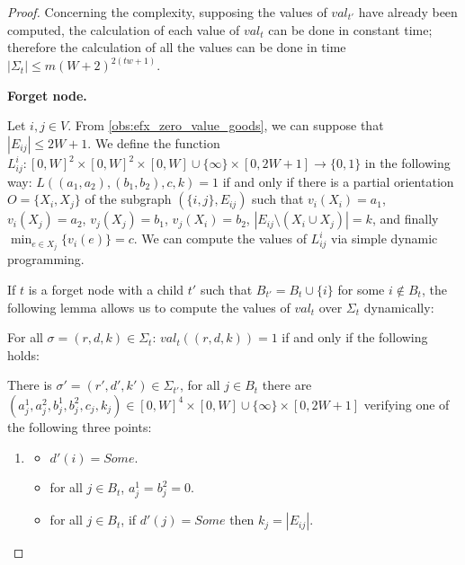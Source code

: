 \documentclass[11pt,letterpaper]{article}
\begin{document}
\begin{proof}
    Concerning the complexity, supposing the values of $val_{t'}$ have already been computed, the calculation of each value of $val_t$ can be done in constant time; therefore the calculation of all the values can be done in time $|\Sigma_t|\leq m(W+2)^{2(tw+1)}$.

    \textbf{Forget node.}

    Let $i,j\in V$. From \cref{obs:efx_zero_value_goods}, we can suppose that $|E_{ij}|\leq 2W +1$. We define the function $L_{ij}^i\colon [0,W]^2\times [0,W]^2\times[0,W]\cup\{\infty\}\times[0,2W+1]\to \{0,1\} $ in the following way:
    $L((a_1,a_2),(b_1,b_2),c,k)=1$ if and only if there is a partial orientation  $O=\{X_i,X_j\}$ of the subgraph $(\{i,j\},E_{ij})$ such that $v_i(X_i)=a_1$, $v_i(X_j)=a_2$, $v_j(X_j)=b_1$, $v_j(X_i)=b_2$, $|E_{ij}\setminus (X_i\cup X_j)|=k$, and finally $\min_{e\in X_j}\{v_i(e)\}=c$. We can compute the values of $L_{ij}^i$ via simple dynamic programming.%

    If $t$ is a forget node with a child $t'$ such that $B_{t'}=B_t\cup \{i\}$ for some $i\notin B_t$, the following lemma allows us to compute the values of $val_t$ over $\Sigma_t$ dynamically:

    \begin{lemma}
        For all $\sigma=(r,d,k)\in \Sigma_t$: $val_t((r,d,k))=1$ if and only if the following holds:


        There is $\sigma'=(r',d',k')\in \Sigma_{t'}$, for all $j\in B_t$ there are $(a_j^1,a_j^2,b_j^1,b_j^2,c_j,k_j)\in [0,W]^4\times [0,W]\cup\{\infty\}\times [0,2W+1]$ verifying one of the following three points:

        \begin{enumerate}
            \item \begin{itemize}
                \item $d'(i)=Some$.
                \item for all $j\in B_t$, $a_j^1=b_j^2=0$.
                \item for all $j\in B_t$, if $d'(j)=Some$ then $k_j=|E_{ij}|$.
                \end{itemize}


\end{enumerate}
\end{lemma}
\end{proof}
\end{document}
